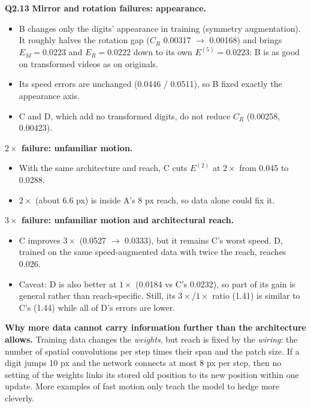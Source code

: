 \documentclass[11pt]{article}
\newcommand{\q}[1]{\par\medskip\noindent\textbf{#1}\quad}
\begin{document}
\q{Q2.13}
\textbf{Mirror and rotation failures: appearance.}
\begin{itemize}
  \item B changes only the digits' appearance in training (symmetry augmentation). It roughly halves the rotation gap ($C_R$ 0.00317 $\to$ 0.00168) and brings $E_M=0.0223$ and $E_R=0.0222$ down to its own $E^{(5)}=0.0223$: B is as good on transformed videos as on originals.
  \item Its speed errors are unchanged (0.0446 / 0.0511), so B fixed exactly the appearance axis.
  \item C and D, which add no transformed digits, do not reduce $C_R$ (0.00258, 0.00423).
\end{itemize}
\textbf{$2\times$ failure: unfamiliar motion.}
\begin{itemize}
  \item With the same architecture and reach, C cuts $E^{(2)}$ at $2\times$ from 0.045 to 0.0288.
  \item $2\times$ (about 6.6 px) is inside A's 8 px reach, so data alone could fix it.
\end{itemize}
\textbf{$3\times$ failure: unfamiliar motion and architectural reach.}
\begin{itemize}
  \item C improves $3\times$ (0.0527 $\to$ 0.0333), but it remains C's worst speed. D, trained on the same speed-augmented data with twice the reach, reaches 0.026.
  \item Caveat: D is also better at $1\times$ (0.0184 vs C's 0.0232), so part of its gain is general rather than reach-specific. Still, its $3\times$/$1\times$ ratio (1.41) is similar to C's (1.44) while all of D's errors are lower.
\end{itemize}
\textbf{Why more data cannot carry information further than the architecture allows.} Training data changes the \emph{weights}, but reach is fixed by the \emph{wiring}: the number of spatial convolutions per step times their span and the patch size. If a digit jumps 10 px and the network connects at most 8 px per step, then no setting of the weights links its stored old position to its new position within one update. More examples of fast motion only teach the model to hedge more cleverly.
\end{document}
